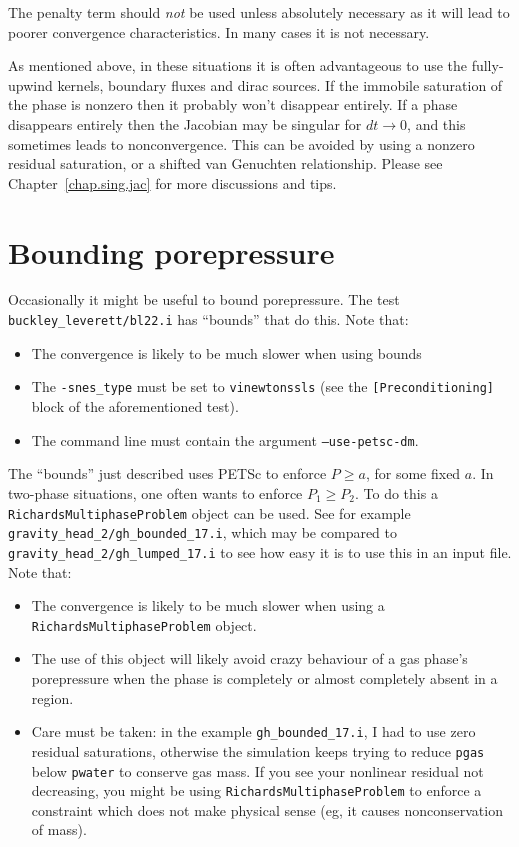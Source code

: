 \documentclass[]{scrreprt}
\begin{document}
The penalty term should {\em not} be used unless absolutely necessary
as it will lead to poorer convergence characteristics.  In many cases
it is not necessary.

As mentioned above, in these situations it is often advantageous to
use the fully-upwind kernels, boundary fluxes and dirac sources.  If
the immobile saturation of the phase is nonzero then it probably won't
disappear entirely.  If a phase disappears entirely then the Jacobian
may be singular for $dt\rightarrow 0$, and this sometimes leads to
nonconvergence.  This can be avoided by using a nonzero residual
saturation, or a shifted van Genuchten relationship.  Please see
Chapter~\ref{chap.sing.jac} for more discussions and tips.






\chapter{Bounding porepressure}
\label{sec.bound.pp}

Occasionally it might be useful to bound porepressure.  The test {\tt
  buckley\_leverett/bl22.i} has ``bounds'' that do this.  Note that:
\begin{itemize}
\item The convergence is likely to be much slower when using bounds
\item The {\tt -snes\_type} must be set to {\tt vinewtonssls} (see the
  {\tt [Preconditioning]} block of the aforementioned test).
\item The command line must contain the argument {\tt --use-petsc-dm}.
\end{itemize}

\noindent The ``bounds'' just described uses PETSc to enforce $P\geq a$, for
some fixed $a$.  In two-phase situations, one often wants to
enforce $P_{1}\geq P_{2}$.  To do this a {\tt
  RichardsMultiphaseProblem} object can be used.  See for example {\tt
  gravity\_head\_2/gh\_bounded\_17.i}, which may be compared to {\tt
  gravity\_head\_2/gh\_lumped\_17.i} to see how easy it is to use
this in an input file.  Note that:
\begin{itemize}
\item The convergence is likely to be much slower when using a {\tt
  RichardsMultiphaseProblem} object.
\item The use of this object will likely avoid crazy behaviour of a
  gas phase's porepressure when the phase is completely or almost
  completely absent in a region.
\item Care must be taken: in the example {\tt gh\_bounded\_17.i}, I
  had to use zero residual saturations, otherwise the simulation keeps
  trying to reduce {\tt pgas} below {\tt pwater} to conserve gas
  mass.  If you see your nonlinear residual not decreasing, you might
  be using {\tt RichardsMultiphaseProblem} to enforce a constraint
  which does not make physical sense (eg, it causes nonconservation of mass).
\end{itemize}
\end{document}

